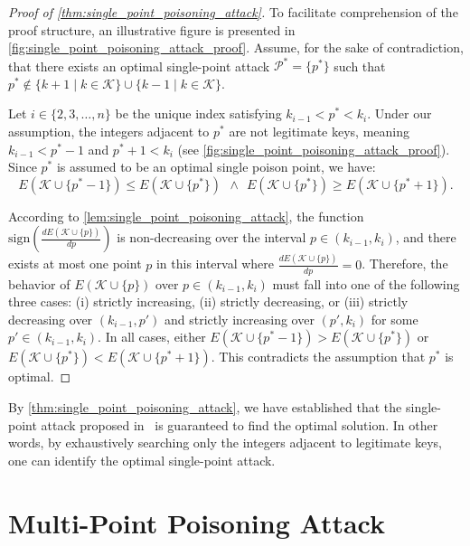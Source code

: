 \documentclass[acmsmall]{acmart}
\begin{document}
\begin{proof}[Proof of \cref{thm:single_point_poisoning_attack}]
To facilitate comprehension of the proof structure, an illustrative figure is presented in \cref{fig:single_point_poisoning_attack_proof}.
Assume, for the sake of contradiction, that there exists an optimal single-point attack $\mathcal{P}^\ast = \{p^\ast\}$ such that $p^\ast \notin \{k + 1 \mid k \in \mathcal{K}\} \cup \{k - 1 \mid k \in \mathcal{K}\}$.

Let $i \in \{2, 3, \dots, n\}$ be the unique index satisfying $k_{i-1} < p^\ast < k_i$.
Under our assumption, the integers adjacent to $p^\ast$ are not legitimate keys, meaning $k_{i-1} < p^\ast - 1$ and $p^\ast + 1 < k_i$ (see \cref{fig:single_point_poisoning_attack_proof}).
Since $p^\ast$ is assumed to be an optimal single poison point, we have:
\begin{equation}
\label{eq:single_point_from_assumption}
    E( \mathcal{K} \cup \{p^\ast {-} 1\}) \leq E( \mathcal{K} \cup \{p^\ast\}) ~~ \land ~~ E( \mathcal{K} \cup \{p^\ast\}) \geq E( \mathcal{K} \cup \{p^\ast {+} 1\}).
\end{equation}

According to \cref{lem:single_point_poisoning_attack}, the function $\mathrm{sign}\left(\frac{d E(\mathcal{K} \cup \{p\})}{dp}\right)$ is non-decreasing over the interval $p \in (k_{i-1}, k_i)$, and there exists at most one point $p$ in this interval where $\frac{d E(\mathcal{K} \cup \{p\})}{dp} = 0$.
Therefore, the behavior of $E(\mathcal{K} \cup \{p\})$ over $p \in (k_{i-1}, k_i)$ must fall into one of the following three cases:
(i) strictly increasing,
(ii) strictly decreasing, or
(iii) strictly decreasing over $(k_{i-1}, p')$ and strictly increasing over $(p', k_i)$ for some $p' \in (k_{i-1}, k_i)$. In all cases, either  $E( \mathcal{K} \cup \{p^\ast - 1\}) > E( \mathcal{K} \cup \{p^\ast\})$ or $ E( \mathcal{K} \cup \{p^\ast\}) < E( \mathcal{K} \cup \{p^\ast + 1\})$. This contradicts the assumption that $p^\ast$ is optimal.
\end{proof}

By \cref{thm:single_point_poisoning_attack}, we have established that the single-point attack proposed in~\cite{kornaropoulos2022price} is guaranteed to find the optimal solution.
In other words, by exhaustively searching only the integers adjacent to legitimate keys, one can identify the optimal single-point attack.

\section{Multi-Point Poisoning Attack}
\label{sec:multi_point_poisoning_attack}
\end{document}
